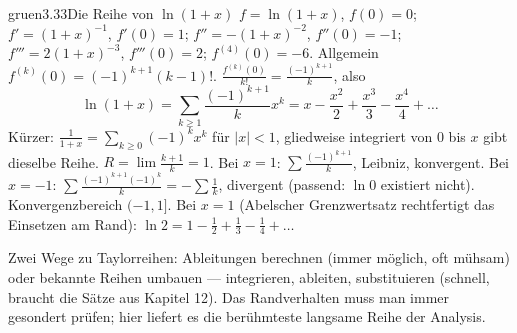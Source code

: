 \begin{loesungkarte}{gruen}{3.33}{Die Reihe von $\ln(1 + x)$}
$f = \ln(1 + x)$, $f(0) = 0$; $f' = (1 + x)^{-1}$, $f'(0) = 1$; $f'' = -(1 + x)^{-2}$, $f''(0) = -1$; $f''' = 2(1 + x)^{-3}$, $f'''(0) = 2$; $f^{(4)}(0) = -6$. Allgemein $f^{(k)}(0) = (-1)^{k+1}(k - 1)!$.
$\frac{f^{(k)}(0)}{k!} = \frac{(-1)^{k+1}}k$, also
\[ \ln(1 + x) = \sum_{k\ge1}\frac{(-1)^{k+1}}kx^{k} = x - \frac{x^{2}}2 + \frac{x^{3}}3 - \frac{x^{4}}4 + \dots \]
Kürzer: $\frac1{1 + x} = \sum_{k\ge0}(-1)^{k}x^{k}$ für $|x| < 1$, gliedweise integriert von $0$ bis $x$ gibt dieselbe Reihe.
$R = \lim\frac{k + 1}k = 1$. Bei $x = 1$: $\sum\frac{(-1)^{k+1}}k$, Leibniz, konvergent. Bei $x = -1$: $\sum\frac{(-1)^{k+1}(-1)^{k}}k = -\sum\frac1k$, divergent (passend: $\ln0$ existiert nicht). Konvergenzbereich $(-1, 1]$.
Bei $x = 1$ (Abelscher Grenzwertsatz rechtfertigt das Einsetzen am Rand): $\ln2 = 1 - \frac12 + \frac13 - \frac14 + \dots$
\begin{mitnehmen}\kastentext
Zwei Wege zu Taylorreihen: Ableitungen berechnen (immer möglich, oft mühsam) oder bekannte Reihen umbauen --- integrieren, ableiten, substituieren (schnell, braucht die Sätze aus Kapitel 12). Das Randverhalten muss man immer gesondert prüfen; hier liefert es die berühmteste langsame Reihe der Analysis.
\end{mitnehmen}
\end{loesungkarte}

